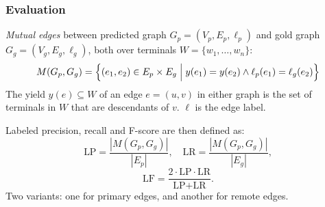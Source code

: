 \documentclass[t,xcolor={svgnames}]{beamer}
\begin{document}
\begin{frame}
\frametitle{Evaluation}
\textit{Mutual edges} between predicted graph $G_p=(V_p,E_p,\ell_p)$
and gold graph $G_g=(V_g,E_g,\ell_g)$,
both over terminals $W = \{w_1,\ldots,w_n\}$:
\[
M(G_p,G_g) =
    \Bigl\{(e_1,e_2) \in E_p \times E_g \;\Big|\;
    y(e_1) = y(e_2) \wedge \ell_p(e_1)=\ell_g(e_2)\Bigr\}
\]
The yield $y(e) \subseteq W$ of an edge $e=(u,v)$ in either graph
is the set of terminals in $W$ that are descendants of $v$. \hfill
$\ell$ is the edge label.

\vfill
Labeled precision, recall and F-score are then defined as:
\[
\text{LP} = \frac{|M(G_p,G_g)|}{|E_p|},\quad
\text{LR} = \frac{|M(G_p,G_g)|}{|E_g|},
\]
\[
\text{LF} = \frac{2 \cdot \text{LP} \cdot \text{LR}}{\text{LP} + \text{LR}}.
\]
Two variants:
one for primary edges, and another for remote edges.
\end{frame}
\end{document}
